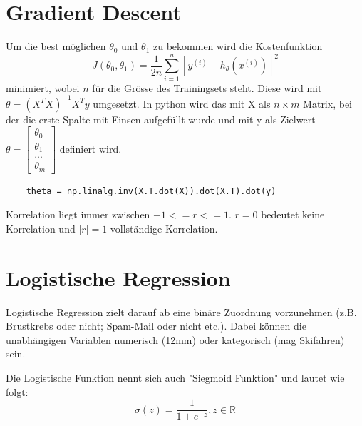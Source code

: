 \documentclass{article}
\begin{document}
\section{Gradient Descent}
	Um die best möglichen $\theta_0$ und $\theta_1$ zu bekommen wird die Kostenfunktion
	\[ J(\theta_0,\theta_1)=\frac{1}{2 n} \sum_{i=1}^{n} [y^{(i)}-h_\theta(x^{(i)})]^2 \] minimiert, wobei $n$ für die Grösse des Trainingsets steht.
	Diese wird mit $\theta = (X^T X)^{-1} X^T y$ umgesetzt. 
	In python wird das mit X als $n \times m$ Matrix, bei der die erste Spalte mit Einsen aufgefüllt wurde und mit y als Zielwert
	$\theta = 
	\begin{bmatrix}
	\theta_0 \\[0.1pt] \theta_1 \\[0.1pt] ... \\[0.1pt] \theta_m
	\end{bmatrix}$ definiert wird.
	
	\begin{lstlisting}
	theta = np.linalg.inv(X.T.dot(X)).dot(X.T).dot(y)
	\end{lstlisting}
	
	Korrelation liegt immer zwischen $-1 <= r <= 1$.
	$r = 0$ bedeutet keine Korrelation und $|r| = 1$ vollständige Korrelation.
\section{Logistische Regression}
Logistische Regression zielt darauf ab eine binäre Zuordnung vorzunehmen (z.B. Brustkrebs oder nicht; Spam-Mail oder nicht etc.).
Dabei können die unabhängigen Variablen numerisch (12mm) oder kategorisch (mag Skifahren) sein.

Die Logistische Funktion nennt sich auch "Siegmoid Funktion" und lautet wie folgt:
$$\sigma(z) = \frac{1}{1+e^{-z}}, z \in \mathbb{R}$$
\end{document}
